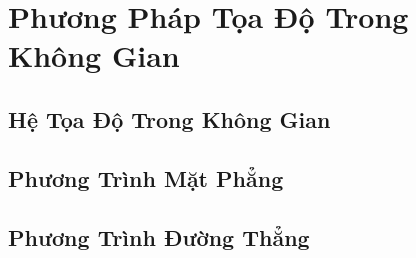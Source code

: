 \documentclass[oneside]{book}
\numberwithin{equation}{section}
\begin{document}

\chapter{Phương Pháp Tọa Độ Trong Không Gian}

\section{Hệ Tọa Độ Trong Không Gian}


\section{Phương Trình Mặt Phẳng}


\section{Phương Trình Đường Thẳng}


\printbibliography[heading=bibintoc]
	
\end{document}
